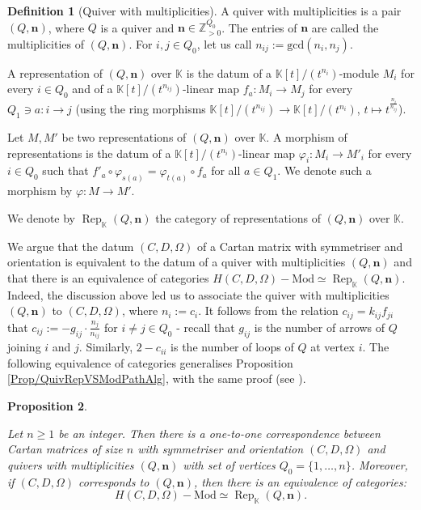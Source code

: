 \documentclass[11pt,english]{article}
\numberwithin{equation}{section}
\numberwithin{figure}{section}
\theoremstyle{definition}
\newtheorem{df}{Definition}[subsection]
\theoremstyle{plain}
\newtheorem{prop}[df]{Proposition}
\theoremstyle{remark}
\DeclareMathOperator{\Rep}{Rep}
\newcommand\nn{\mathbf{n}}
\newcommand\ZZ{\mathbb{Z}}
\newcommand\KK{\mathbb{K}}
\begin{document}
\begin{df}[Quiver with multiplicities]\index[notations]{q@$(Q,\nn)$ - quiver with multiplicities}

A quiver with multiplicities is a pair $(Q,\mathbf{n})$, where $Q$
is a quiver and $\mathbf{n}\in\ZZ_{>0}^{Q_{0}}$. The entries of $\mathbf{n}$
are called the multiplicities of $(Q,\mathbf{n})$. For $i,j\in Q_{0}$,
let us call $n_{ij}:=\mathrm{gcd}(n_{i},n_{j})$.

A representation of $(Q,\mathbf{n})$ over $\KK$ is the datum of
a $\KK[t]/(t^{n_{i}})$-module $M_{i}$ for every $i\in Q_{0}$ and
of a $\KK[t]/(t^{n_{ij}})$-linear map $f_{a}:M_{i}\rightarrow M_{j}$
for every $Q_{1}\ni a:i\rightarrow j$ (using the ring morphisms $\KK[t]/(t^{n_{ij}})\rightarrow\KK[t]/(t^{n_{i}})$,
$t\mapsto t^{\frac{n_{i}}{n_{ij}}}$).

Let $M,M'$ be two representations of $(Q,\mathbf{n})$ over $\KK$.
A morphism of representations is the datum of a $\KK[t]/(t^{n_{i}})$-linear
map $\varphi_{i}:M_{i}\rightarrow M'_{i}$ for every $i\in Q_{0}$
such that $f'_{a}\circ\varphi_{s(a)}=\varphi_{t(a)}\circ f_{a}$ for
all $a\in Q_{1}$. We denote such a morphism by $\varphi:M\rightarrow M'$.

We denote by $\Rep_{\KK}(Q,\mathbf{n})$ the category of representations
of $(Q,\mathbf{n})$ over $\KK$.

\end{df}

We argue that the datum $(C,D,\Omega)$ of a Cartan matrix with symmetriser
and orientation is equivalent to the datum of a quiver with multiplicities
$(Q,\mathbf{n})$ and that there is an equivalence of categories $H(C,D,\Omega)-\mathrm{Mod}\simeq\Rep_{\KK}(Q,\mathbf{n})$.
Indeed, the discussion above led us to associate the quiver with multiplicities
$(Q,\mathbf{n})$ to $(C,D,\Omega)$, where $n_{i}:=c_{i}$. It follows
from the relation $c_{ij}=k_{ij}f_{ji}$ that $c_{ij}:=-g_{ij}\cdot\frac{n_{j}}{n_{ij}}$
for $i\ne j\in Q_{0}$ - recall that $g_{ij}$ is the number of arrows
of $Q$ joining $i$ and $j$. Similarly, $2-c_{ii}$ is the number
of loops of $Q$ at vertex $i$. The following equivalence of categories
generalises Proposition \ref{Prop/QuivRepVSModPathAlg}, with the
same proof (see \cite[\S 1.]{CB92}).

\begin{prop} \label{Prop/QuivMultVsGLSAlg}

Let $n\geq1$ be an integer. Then there is a one-to-one correspondence
between Cartan matrices of size $n$ with symmetriser and orientation
$(C,D,\Omega)$ and quivers with multiplicities $(Q,\mathbf{n})$
with set of vertices $Q_{0}=\{1,\ldots,n\}$. Moreover, if $(C,D,\Omega)$
corresponds to $(Q,\mathbf{n})$, then there is an equivalence of
categories:\[
H(C,D,\Omega)-\mathrm{Mod}\simeq\Rep_{\KK}(Q,\mathbf{n}).
\]

\end{prop}
\end{document}

